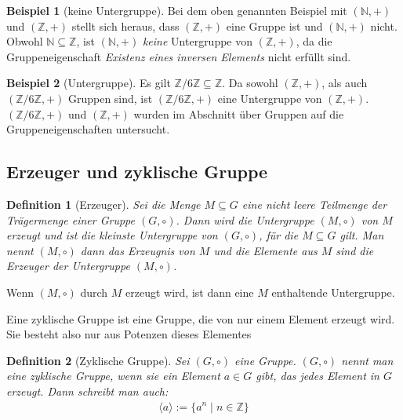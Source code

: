 \documentclass[12pt,a4paper, usenames, dvipsnames]{article}
\theoremstyle{mystyle}
\newtheorem{definition}{Definition}
\theoremstyle{definition}
\newtheorem{bsp}{Beispiel}[definition]
\begin{document}
\begin{bsp}[keine Untergruppe]

Bei dem oben genannten Beispiel mit $(\mathbb{N},+)$ und $(\mathbb{Z},+)$ stellt sich heraus, dass $(\mathbb{Z},+)$ eine Gruppe ist und $(\mathbb{N},+)$ nicht. Obwohl $\mathbb{N \subseteq \mathbb{Z}}$, ist $(\mathbb{N},+)$ \textit{keine} Untergruppe von $(\mathbb{Z},+)$, da die Gruppeneigenschaft \textit{Existenz eines inversen Elements} nicht erfüllt sind.

\end{bsp}
\begin{bsp}[Untergruppe]

Es gilt $\mathbb{Z}/6\mathbb{Z} \subseteq \mathbb{Z}$. Da sowohl $(\mathbb{Z},+)$, als auch $(\mathbb{Z}/6\mathbb{Z}, +)$ Gruppen sind, ist $(\mathbb{Z}/6\mathbb{Z}, +)$ eine Untergruppe von $(\mathbb{Z},+)$. $(\mathbb{Z}/6\mathbb{Z}, +)$ und $(\mathbb{Z},+)$ wurden im Abschnitt über Gruppen auf die Gruppeneigenschaften untersucht.

\end{bsp}

%
%
%
%
%
%
%
%
%
%

\subsection*{Erzeuger und zyklische Gruppe} 



\begin{definition}[Erzeuger]
Sei die Menge $M \subseteq G$ eine nicht leere Teilmenge der Trägermenge einer Gruppe $(G, \circ)$. 
Dann wird die Untergruppe $(M, \circ)$ von $M$ erzeugt und ist die kleinste Untergruppe von $(G, \circ)$, für die $M \subseteq G$ gilt.
Man nennt $(M, \circ)$ dann das Erzeugnis von $M$ und die Elemente aus $M$ sind die Erzeuger der Untergruppe $(M, \circ)$.
\end{definition}

Wenn $(M, \circ)$ durch $M$ erzeugt wird, ist dann eine $M$ enthaltende Untergruppe.

Eine zyklische Gruppe ist eine Gruppe, die von nur einem Element erzeugt wird. Sie besteht also nur aus Potenzen dieses Elementes

\begin{definition}[Zyklische Gruppe]
Sei $(G, \circ)$ eine Gruppe. $(G, \circ)$ nennt man eine zyklische Gruppe, wenn sie ein Element $a \in G$ gibt, das jedes Element in $G$ erzeugt. Dann schreibt man auch:
\begin{align*}
\langle a \rangle := \{ a^n \mid n \in \mathbb{Z} \}
\end{align*}

\end{definition}
\end{document}
